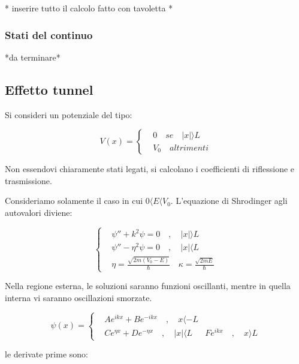 \documentclass{article}
\begin{document}
* inserire tutto il calcolo fatto con tavoletta *

\subsubsection{Stati del continuo}
*da terminare*

\subsection{Effetto tunnel}
Si consideri un potenziale del tipo:

\begin{equation}
  V(x)=
  \left\{
  \begin{aligned}
     & 0 \quad se \quad |x|\rangle L \\
     & V_0 \quad altrimenti
  \end{aligned}
  \right.
\end{equation}

Non essendovi chiaramente stati legati, si calcolano i coefficienti di riflessione e trasmissione.

Consideriamo solamente il caso in cui $0\langle E\langle V_0$.
L'equazione di Shrodinger agli autovalori diviene:

\begin{equation}
  \left\{
  \begin{aligned}
     & \psi''+k^2\psi=0  \quad , \quad |x|\rangle L                                \\
     & \psi''-\eta^2\psi=0  \quad , \quad |x|\langle L                             \\
     & \eta= \frac{\sqrt{2m(V_0-E)}}{\hbar} \quad \kappa= \frac{\sqrt{2mE}}{\hbar}
  \end{aligned}
  \right.
\end{equation}

Nella regione esterna, le soluzioni saranno funzioni oscillanti, mentre in quella interna vi saranno oscillazioni smorzate.

\begin{equation}
  \psi(x)=
  \left\{
  \begin{aligned}
     & Ae^{ikx}+Be^{-ikx} \quad , \quad x\langle -L        \\
     & Ce^{\eta x}+De^{-\eta x} \quad , \quad |x|\langle L
     & Fe^{ikx} \quad , \quad x\rangle L
  \end{aligned}
  \right.
\end{equation}

le derivate prime sono:
\end{document}
